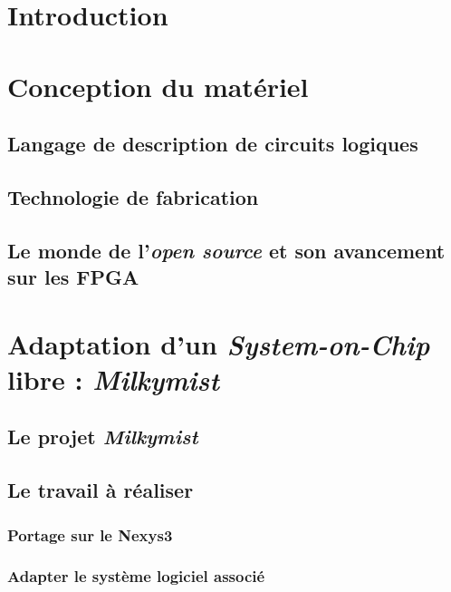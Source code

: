\documentclass{report}
\begin{document}
\tableofcontents

\chapter*{Introduction} 


\chapter{Conception du matériel}

\section{Langage de description de circuits logiques}  \newpage

\section{Technologie de fabrication} 

\section{Le monde de l'\textit{open source} et son avancement sur les FPGA}
 \newpage

\chapter{Adaptation d'un \textit{System-on-Chip} libre : \textit{Milkymist}}

\section{Le projet \textit{Milkymist}}
 \newpage

\section{Le travail à réaliser}

\subsection{Portage sur le Nexys3}

 \newpage

\subsection{Adapter le système logiciel associé}

\newpage
\end{document}
